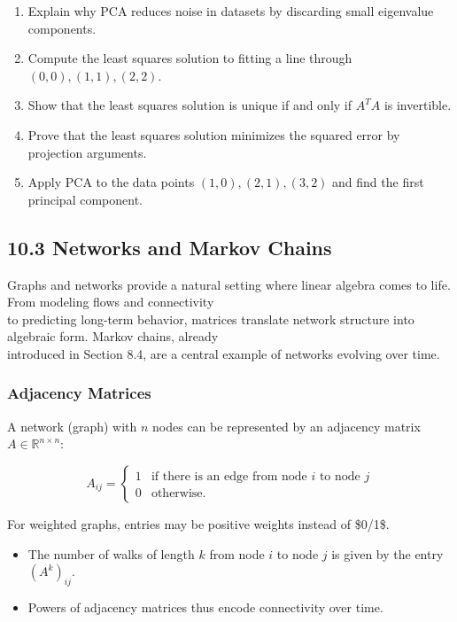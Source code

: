 \documentclass[
  12pt,
  a4paper,
]{article}
\begin{document}
\begin{enumerate}
\def\labelenumi{\arabic{enumi}.}
\item
  Explain why PCA reduces noise in datasets by discarding small
  eigenvalue components.
\item
  Compute the least squares solution to fitting a line through
  \((0,0), (1,1), (2,2)\).
\item
  Show that the least squares solution is unique if and only if
  \(A^T A\) is invertible.
\item
  Prove that the least squares solution minimizes the squared error by
  projection arguments.
\item
  Apply PCA to the data points \((1,0), (2,1), (3,2)\) and find the
  first principal component.
\end{enumerate}

\subsection{10.3 Networks and Markov
Chains}\label{103-networks-and-markov-chains}

Graphs and networks provide a natural setting where linear algebra comes
to life. From modeling flows and connectivity\\
to predicting long-term behavior, matrices translate network structure
into algebraic form. Markov chains, already\\
introduced in Section 8.4, are a central example of networks evolving
over time.

\subsubsection{Adjacency Matrices}\label{adjacency-matrices}

A network (graph) with \(n\) nodes can be represented by an adjacency
matrix \(A \in \mathbb{R}^{n \times n}\):

\[A_{ij} =
\begin{cases}
1 & \text{if there is an edge from node \(i\) to node \(j\)} \\
0 & \text{otherwise.}
\end{cases}\]

For weighted graphs, entries may be positive weights instead of \$0/1\$.

\begin{itemize}
\item
  The number of walks of length \(k\) from node \(i\) to node \(j\) is
  given by the entry \((A^k)_{ij}\).
\item
  Powers of adjacency matrices thus encode connectivity over time.
\end{itemize}
\end{document}
